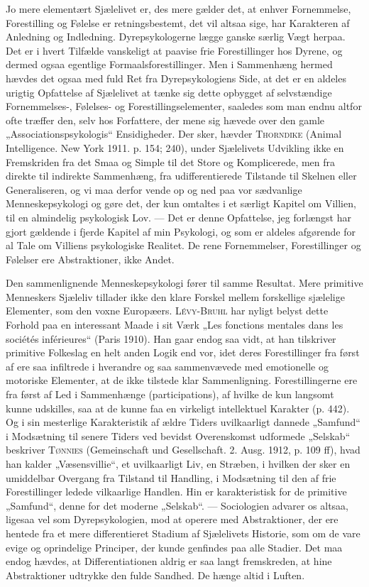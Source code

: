 \documentclass[12pt,a4paper,openany]{book}
\newcommand{\opage}[1]{\marginnote{\footnotesize\textit{[#1]}}}
\begin{document}
Jo mere elementært Sjælelivet er, des mere gælder det,
at enhver Fornemmelse, Forestilling og Følelse er retningsbestemt,
det vil altsaa sige, har Karakteren af Anledning og
Indledning. Dyrepsykologerne lægge ganske særlig Vægt herpaa.
Det er i hvert Tilfælde vanskeligt at paavise frie Forestillinger
hos Dyrene, og dermed ogsaa egentlige Formaalsforestillinger.
Men i Sammenhæng hermed hævdes det ogsaa med fuld Ret
fra Dyrepsykologiens Side, at det er en aldeles urigtig Opfattelse
af Sjælelivet at tænke sig dette opbygget af selvstændige
Fornemmelses-, Følelses- og Forestillingselementer, saaledes
som man endnu altfor ofte træffer den, selv hos Forfattere,
der mene sig hævede over den gamle „Associationspsykologis“
Ensidigheder. Der sker, hævder \textsc{Thorndike} (Animal
Intelligence. New York 1911. p. 154; 240), under Sjælelivets
Udvikling ikke en Fremskriden fra det Smaa og Simple
til det Store og Komplicerede, men fra direkte til indirekte
Sammenhæng, fra udifferentierede Tilstande til Skelnen eller
Generaliseren, og vi maa derfor vende op og ned paa vor sædvanlige
Menneskepsykologi og gøre det, der kun omtaltes i et
særligt Kapitel om Villien, til en almindelig psykologisk Lov.
--- Det er denne Opfattelse, jeg forlængst har gjort gældende
i fjerde Kapitel af min Psykologi, og som er aldeles afgørende
for al Tale om Villiens psykologiske Realitet. De rene Fornemmelser,
Forestillinger og Følelser ere Abstraktioner, ikke
Andet.

Den sammenlignende Menneskepsykologi fører til samme
Resultat. Mere primitive Menneskers Sjæleliv tillader ikke den
klare Forskel mellem forskellige sjælelige Elementer, som den
voxne Europæers. \textsc{Lévy-Bruhl} har nyligt belyst dette Forhold
paa en interessant Maade i sit Værk „Les fonctions mentales
\setcounter{footnote}{0}%
\opage{51}dans les sociétés inférieures“ (Paris 1910). Han gaar endog
saa vidt, at han tilskriver primitive Folkeslag en helt anden
Logik end vor, idet deres Forestillinger fra først af ere saa
infiltrede i hverandre og saa sammenvævede med emotionelle
og motoriske Elementer, at de ikke tilstede klar Sammenligning.
Forestillingerne ere fra først af Led i Sammenhænge (participations),
af hvilke de kun langsomt kunne udskilles, saa at de
kunne faa en virkeligt intellektuel Karakter (p. 442). Og i sin
mesterlige Karakteristik af ældre Tiders uvilkaarligt dannede
„Samfund“ i Modsætning til senere Tiders ved bevidst Overenskomst
udformede „Selskab“ beskriver \textsc{Tønnies} (Gemeinschaft
und Gesellschaft. 2. Ausg. 1912, p. 109 ff), hvad han
kalder „Væsensvillie“, et uvilkaarligt Liv, en Stræben, i hvilken
der sker en umiddelbar Overgang fra Tilstand til Handling,
i Modsætning til den af frie Forestillinger ledede vilkaarlige
Handlen. Hin er karakteristisk for de primitive „Samfund“,
denne for det moderne „Selskab“. --- Sociologien advarer os
altsaa, ligesaa vel som Dyrepsykologien, mod at operere med
Abstraktioner, der ere hentede fra et mere differentieret Stadium
af Sjælelivets Historie, som om de vare evige og oprindelige
Principer, der kunde genfindes paa alle Stadier. Det maa
endog hævdes, at Differentiationen aldrig er saa langt fremskreden,
at hine Abstraktioner udtrykke den fulde Sandhed. De
hænge altid i Luften.
\end{document}
